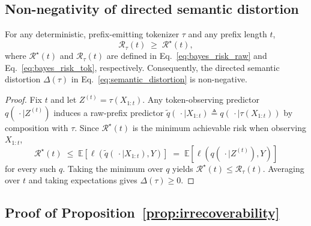\subsection{Non-negativity of directed semantic distortion}
\label{app:distortion_nonneg}

\begin{proposition}
\label{prop:distortion_nonneg}
For any deterministic, prefix-emitting tokenizer $\tau$ and any prefix length $t$,
\[
\mathcal{R}_\tau(t) \;\ge\; \mathcal{R}^\star(t),
\]
where $\mathcal{R}^\star(t)$ and $\mathcal{R}_\tau(t)$ are defined in
Eq.~\eqref{eq:bayes_risk_raw} and Eq.~\eqref{eq:bayes_risk_tok}, respectively.
Consequently, the directed semantic distortion $\Delta(\tau)$ in Eq.~\eqref{eq:semantic_distortion} is non-negative.
\end{proposition}

\begin{proof}
Fix $t$ and let $Z^{(t)}=\tau(X_{1:t})$.
Any token-observing predictor $q(\,\cdot \mid Z^{(t)})$ induces a raw-prefix predictor
$\tilde{q}(\,\cdot \mid X_{1:t}) \triangleq q(\,\cdot \mid \tau(X_{1:t}))$ by composition with $\tau$.
Since $\mathcal{R}^\star(t)$ is the minimum achievable risk when observing $X_{1:t}$,
\[
\mathcal{R}^\star(t)
\;\le\;
\mathbb{E}\!\left[\ell\!\left(\tilde{q}(\,\cdot \mid X_{1:t}),Y\right)\right]
\;=\;
\mathbb{E}\!\left[\ell\!\left(q(\,\cdot \mid Z^{(t)}),Y\right)\right]
\]
for every such $q$.
Taking the minimum over $q$ yields $\mathcal{R}^\star(t)\le \mathcal{R}_\tau(t)$.
Averaging over $t$ and taking expectations gives $\Delta(\tau)\ge 0$.
\end{proof}

\subsection{Proof of Proposition~\ref{prop:irrecoverability}}
\label{app:proof_irrecoverability}

